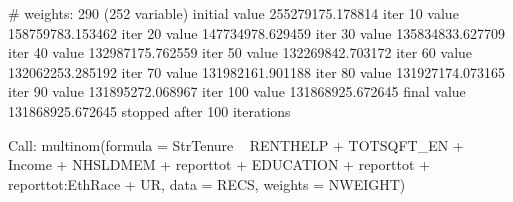 \documentclass{article}
\begin{document}
\begin{Schunk}
\begin{Soutput}
# weights:  290 (252 variable)
initial  value 255279175.178814 
iter  10 value 158759783.153462
iter  20 value 147734978.629459
iter  30 value 135834833.627709
iter  40 value 132987175.762559
iter  50 value 132269842.703172
iter  60 value 132062253.285192
iter  70 value 131982161.901188
iter  80 value 131927174.073165
iter  90 value 131895272.068967
iter 100 value 131868925.672645
final  value 131868925.672645 
stopped after 100 iterations
\end{Soutput}
\begin{Soutput}
Call:
multinom(formula = StrTenure ~ RENTHELP + TOTSQFT_EN + Income + 
    NHSLDMEM + reporttot + EDUCATION + reporttot + reporttot:EthRace + 
    UR, data = RECS, weights = NWEIGHT)


\end{Soutput}
\end{Schunk}
\end{document}
